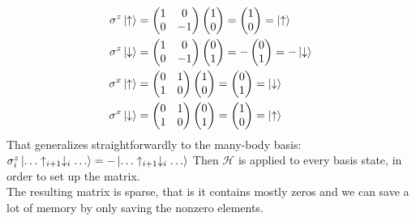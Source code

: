 \documentclass{article}
\begin{document}
\begin{align*}
\sigma^z \ket{\uparrow} &= 
\begin{pmatrix}
1 & 0\\
0 & -1
\end{pmatrix}
\begin{pmatrix}
1\\
0
\end{pmatrix} = 
\begin{pmatrix}
1\\
0
\end{pmatrix} = \ket{\uparrow}
\\
\sigma^z \ket{\downarrow} &= 
\begin{pmatrix}
1 & 0\\
0 & -1
\end{pmatrix}
\begin{pmatrix}
0\\
1
\end{pmatrix} = -
\begin{pmatrix}
0\\
1
\end{pmatrix} = -\ket{\downarrow}
\\
\sigma^x \ket{\uparrow} &= 
\begin{pmatrix}
0 & 1\\
1 & 0
\end{pmatrix}
\begin{pmatrix}
1\\
0
\end{pmatrix} = 
\begin{pmatrix}
0\\
1
\end{pmatrix} = \ket{\downarrow}
\\
\sigma^x \ket{\downarrow} &= 
\begin{pmatrix}
0 & 1\\
1 & 0
\end{pmatrix}
\begin{pmatrix}
0\\
1
\end{pmatrix} =
\begin{pmatrix}
1\\
0
\end{pmatrix} = \ket{\uparrow}
\end{align*}
That generalizes straightforwardly to the many-body basis: $\sigma_i^z
\ket{\dotso \uparrow_{i+1} \downarrow_i \dotso} = - \ket{\dotso \uparrow_{i+1} \downarrow_i\dotso} $ Then $\mathcal{H}$ is applied to every basis state, in order to set up the matrix.\\The resulting matrix is sparse, that is it contains mostly zeros and we can save a lot of memory by only saving the nonzero elements.\\
\end{document}
